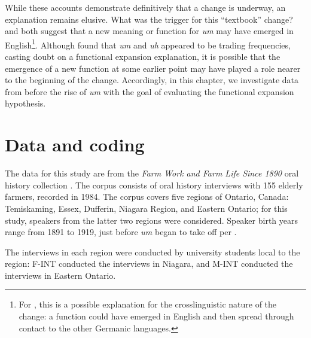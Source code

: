 \documentclass[11pt]{article}
\begin{document}
While these accounts demonstrate definitively that a change is underway, an
explanation remains elusive.
What was the trigger for this ``textbook'' change?
\textcite{fruehwald2016} and \textcite{wielingetal2016} both suggest that a new
meaning or function for \emph{um} may have emerged in English\footnote{%
    For \textcite{wielingetal2016}, this is a possible explanation for the
    crosslinguistic nature of the change: a function could have emerged in
    English and then spread through contact to the other Germanic languages.
}.
Although \textcite{fruehwald2016} found that \emph{um} and \emph{uh} appeared to
be trading frequencies, casting doubt on a functional expansion explanation, it
is possible that the emergence of a new function at some earlier point may have
played a role nearer to the beginning of the change.
Accordingly, in this chapter, we investigate data from before the rise of \emph{um} with the goal of evaluating the functional expansion hypothesis.

\section{Data and coding}

The data for this study are from the \emph{Farm Work and Farm Life Since 1890}
oral history collection \parencite{denis2016}.
The corpus consists of oral history interviews with 155 elderly farmers,
recorded in 1984.
The corpus covers five regions of Ontario, Canada: Temiskaming, Essex, Dufferin,
Niagara Region, and Eastern Ontario; for this study, speakers from the latter
two regions were considered.
Speaker birth years range from 1891 to 1919, just before \emph{um} began to take
off per \textcite{fruehwald2016}.

The interviews in each region were conducted by university students local to the
region: F-INT conducted the interviews in Niagara, and M-INT conducted the
interviews in Eastern Ontario.
\end{document}
